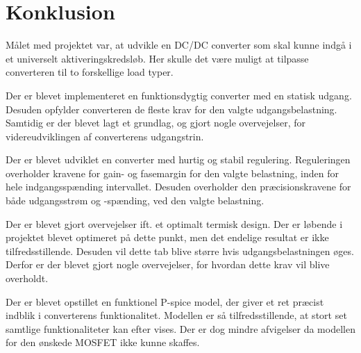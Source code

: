 
\chapter{Konklusion}
Målet med projektet var, at udvikle en DC/DC converter som skal kunne indgå i et universelt aktiveringskredsløb. Her skulle det være muligt at tilpasse converteren til to forskellige load typer. 

Der er blevet implementeret en funktionsdygtig converter med en statisk udgang. Desuden opfylder converteren de fleste krav for den valgte udgangsbelastning. Samtidig er der blevet lagt et grundlag, og gjort nogle overvejelser, for videreudviklingen af converterens udgangstrin. 

Der er blevet udviklet en converter med hurtig og stabil regulering. Reguleringen overholder kravene for gain- og fasemargin for den valgte belastning, inden for hele indgangsspænding intervallet. Desuden overholder den præcisionskravene for både udgangsstrøm og -spænding, ved den valgte belastning. 

Der er blevet gjort overvejelser ift. et optimalt termisk design. Der er løbende i projektet blevet optimeret på dette punkt, men det endelige resultat er ikke tilfredsstillende. Desuden vil dette tab blive større hvis udgangsbelastningen øges. Derfor er der blevet gjort nogle overvejelser, for hvordan dette krav vil blive overholdt. 

Der er blevet opstillet en funktionel P-spice model, der giver et ret præcist indblik i converterens funktionalitet. Modellen er så tilfredsstillende, at stort set samtlige funktionaliteter kan efter vises. Der er dog mindre afvigelser da modellen for den ønskede MOSFET ikke kunne skaffes.

